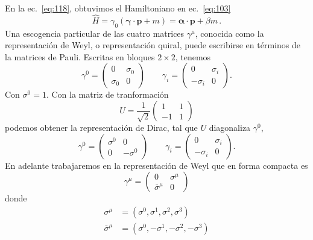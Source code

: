 En la ec.~\eqref{eq:118}, obtuvimos el Hamiltoniano en ec.~\eqref{eq:103}
\begin{equation}
  \hat{H}= \gamma_0(\boldsymbol{\gamma}\cdot\mathbf{p}+m)=\boldsymbol{\alpha}\cdot\mathbf{p}+\beta m\,.
\end{equation}
Una escogencia particular de las cuatro matrices $\gamma^\mu$, conocida como la representaci\'on de Weyl, o representaci\'on quiral, puede escribirse en t\'erminos de la matrices de Pauli. Escritas en bloques $2\times2$, tenemos
\begin{equation}
  \gamma^0=
  \begin{pmatrix}
    0&\sigma_0\\
    \sigma_0&0
  \end{pmatrix}\qquad
  \gamma_i=\begin{pmatrix}
    0&\sigma_i\\
    -\sigma_i&0
  \end{pmatrix}.
\end{equation}
Con $\sigma^0=1$. Con la matriz de tranformaci\'on
\begin{equation}
  U=\frac{1}{\sqrt{2}}
  \begin{pmatrix}
    1&1\\
    -1&1    
  \end{pmatrix}
\end{equation}
podemos obtener la representaci\'on de Dirac, tal que $U$ diagonaliza $\gamma^0$,
\begin{equation}
  \gamma^0=
  \begin{pmatrix}
    \sigma^0&0\\
    0&-\sigma^0
  \end{pmatrix}\qquad
  \gamma_i=\begin{pmatrix}
    0&\sigma_i\\
    -\sigma_i&0
  \end{pmatrix}.
\end{equation}
En adelante trabajaremos en la representaci\'on de Weyl que en forma compacta es
\begin{equation}
  \gamma^\mu=\begin{pmatrix}
    0&\sigma^\mu\\
    \bar{\sigma}^\mu & 0
  \end{pmatrix}
\end{equation}
donde
\begin{align}
  \sigma^\mu&=(\sigma^0,\sigma^1,\sigma^2,\sigma^3)\nonumber\\
  \bar{\sigma}^\mu&=(\sigma^0,-\sigma^1,-\sigma^2,-\sigma^3)\nonumber\\
\end{align}
